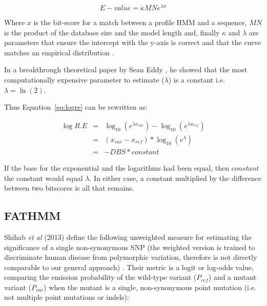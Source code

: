 \documentclass[fleqn,10pt]{SelfArx} %
\begin{document}
\begin{equation} 
\label{eq:eval}
E-value = \kappa MN e^{\lambda x}
\end{equation}

Where $x$ is the bit-score for a match between a profile HMM and a
sequence, $MN$ is the product of the database size and the model length
and, finally $\kappa$ and $\lambda$ are parameters that ensure the
intercept with the y-axis is correct and that the curve matches an
empirical distribution .

In a breakthrough theoretical paper by Sean Eddy \cite{Eddy:2008}, he
showed that the most computationally expensive parameter to estimate
($\lambda$) is a constant i.e.  $\lambda=\ln(2)$.

Thus Equation~\ref{eq:logre} can be rewritten as: 

\begin{eqnarray}
\label{eq:logre2}
\log R.E %
       &=& \log_{10} \left( e^{\lambda x_{var}} \right) - \log_{10} \left( e^{\lambda x_{ref}} \right)  \\
       &=& \left(x_{var}-x_{ref}\right)*\log_{10}(e^{\lambda})                                   \nonumber \\
       &=& -DBS*constant \nonumber 
\end{eqnarray}

If the base for the exponential and the logarithms had been equal,
then $constant$ the constant would equal $\lambda$. In either case, a
constant multiplied by the difference between two bitscores is all
that remains.

\subsection{FATHMM}

Shihab \emph{et al} (2013) define the following unweighted measure for
estimating the significance of a single non-synonymous SNP (the
weighted version is trained to discriminate human disease from
polymorphic variation, therefore is not directly comparable to our
general approach) \cite{Shihab:2013}. Their metric is a logit or log-odds value, comparing the
emission probability of the wild-type variant ($P_{ref}$) and a mutant
variant ($P_{var}$) when the mutant is a single, non-synonymous point
mutation (i.e. not multiple point mutations or indels):
\end{document}
